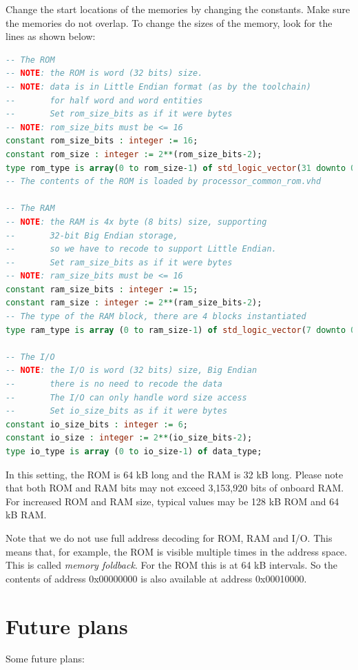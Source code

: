 \documentclass[12pt]{article}
\begin{document}
Change the start locations of the memories by changing the constants. Make sure the memories do not overlap. To change the sizes of the memory, look for the lines as shown below:

\begin{lstlisting}[language=VHDL]
-- The ROM
-- NOTE: the ROM is word (32 bits) size.
-- NOTE: data is in Little Endian format (as by the toolchain)
--       for half word and word entities
--       Set rom_size_bits as if it were bytes
-- NOTE: rom_size_bits must be <= 16
constant rom_size_bits : integer := 16;
constant rom_size : integer := 2**(rom_size_bits-2);
type rom_type is array(0 to rom_size-1) of std_logic_vector(31 downto 0);
-- The contents of the ROM is loaded by processor_common_rom.vhd

-- The RAM
-- NOTE: the RAM is 4x byte (8 bits) size, supporting
--       32-bit Big Endian storage,
--       so we have to recode to support Little Endian.
--       Set ram_size_bits as if it were bytes
-- NOTE: ram_size_bits must be <= 16
constant ram_size_bits : integer := 15;
constant ram_size : integer := 2**(ram_size_bits-2);
-- The type of the RAM block, there are 4 blocks instantiated
type ram_type is array (0 to ram_size-1) of std_logic_vector(7 downto 0);
                    
-- The I/O
-- NOTE: the I/O is word (32 bits) size, Big Endian
--       there is no need to recode the data
--       The I/O can only handle word size access
--       Set io_size_bits as if it were bytes
constant io_size_bits : integer := 6;
constant io_size : integer := 2**(io_size_bits-2);
type io_type is array (0 to io_size-1) of data_type;
\end{lstlisting}

In this setting, the ROM is 64 kB long and the RAM is 32 kB long. Please note that both ROM and RAM bits may not exceed 3,153,920 bits of onboard RAM. For increased ROM and RAM size, typical values may be 128 kB ROM and 64 kB RAM.

Note that we do not use full address decoding for ROM, RAM and I/O. This means that, for example, the ROM is visible multiple times in the address space. This is called \emph{memory foldback}. For the ROM this is at 64 kB intervals. So the contents of address 0x00000000 is also available at address 0x00010000.

\section{Future plans}
Some future plans:
\end{document}
